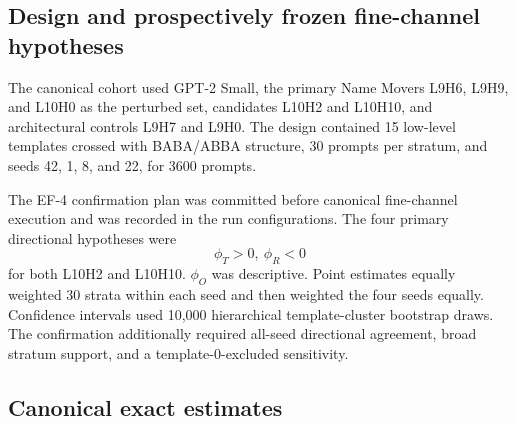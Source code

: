 \documentclass[preprint,12pt,authoryear]{elsarticle}
\begin{document}
\subsection{Design and prospectively frozen fine-channel hypotheses}

The canonical cohort used GPT-2 Small, the primary Name Movers L9H6, L9H9, and
L10H0 as the perturbed set, candidates L10H2 and L10H10, and architectural controls
L9H7 and L9H0. The design contained 15 low-level templates crossed with BABA/ABBA
structure, 30 prompts per stratum, and seeds 42, 1, 8, and 22, for 3600 prompts.

The EF-4 confirmation plan was committed before canonical fine-channel execution
and was recorded in the run configurations. The four primary directional hypotheses
were
\[
\phi_T>0,\ \phi_R<0
\]
for both L10H2 and L10H10. $\phi_O$ was descriptive. Point estimates equally
weighted 30 strata within each seed and then weighted the four seeds equally.
Confidence intervals used 10,000 hierarchical template-cluster bootstrap draws.
The confirmation additionally required all-seed directional agreement, broad
stratum support, and a template-0-excluded sensitivity.

\subsection{Canonical exact estimates}
\end{document}

